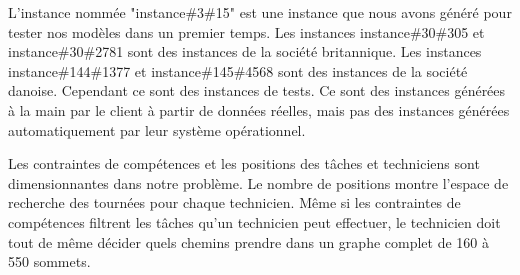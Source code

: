 L'instance nommée "instance\#3\#15" est une instance que nous avons généré pour tester nos modèles dans un premier temps.
Les instances instance\#30\#305 et instance\#30\#2781 sont des instances de la société britannique.
Les instances instance\#144\#1377 et instance\#145\#4568 sont des instances de la société danoise.
Cependant ce sont des instances de tests.
Ce sont des instances générées à la main par le client à partir de données réelles, mais pas des instances générées automatiquement par leur système opérationnel.

Les contraintes de compétences et les positions des tâches et techniciens sont dimensionnantes dans notre problème.
Le nombre de positions montre l'espace de recherche des tournées pour chaque technicien.
Même si les contraintes de compétences filtrent les tâches qu'un technicien peut effectuer, le technicien doit tout de même décider quels chemins prendre dans un graphe complet de 160 à 550 sommets.





